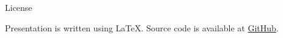 \begin{withoutheadline}
    \begin{frame}{License}
        \begin{center}
            Presentation is written using \LaTeX. Source code is available at \href{https://github.com/hvarga/openwrt-application-development}{GitHub}.
        \end{center}
        \vfill
        \begin{center}
            \doclicenseImage
            \\
            \doclicenseLongText
        \end{center}
    \end{frame}
\end{withoutheadline}
